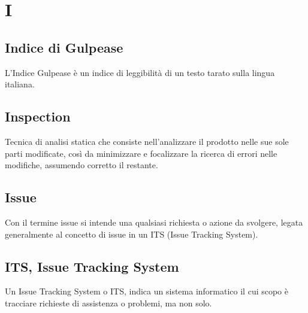 \section{I}
	\subsection{Indice di Gulpease}
		L'Indice Gulpease è un indice di leggibilità di un testo tarato sulla lingua italiana.
	\subsection{Inspection} 
		Tecnica di analisi statica che consiste nell'analizzare il prodotto nelle sue sole parti modificate, così da minimizzare e focalizzare la ricerca di errori nelle modifiche, assumendo corretto il restante.
	\subsection{Issue}  
		Con il termine issue si intende una qualsiasi richiesta o azione da svolgere, legata generalmente al concetto di issue in un ITS (Issue Tracking System).
	\subsection{ITS, Issue Tracking System}  
		Un Issue Tracking System o ITS, indica un sistema informatico il cui scopo è tracciare richieste di assistenza o problemi, ma non solo.
	
\newpage